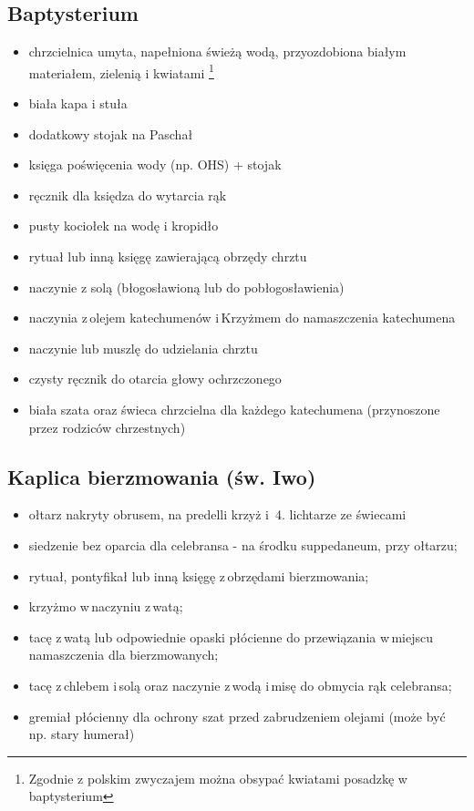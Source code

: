\subsection{Baptysterium}
\begin{itemize}
	\item chrzcielnica umyta, napełniona świeżą wodą, przyozdobiona
	      białym materiałem, zielenią i kwiatami \footnote{Zgodnie z polskim
			  zwyczajem można obsypać kwiatami posadzkę w baptysterium}
	\item \textcolor{black!50}{biała kapa i stuła}
	\item dodatkowy stojak na Paschał
	\item księga poświęcenia wody (np. OHS) + stojak
	\item ręcznik dla księdza do wytarcia rąk
	\item pusty kociołek na wodę i kropidło
	\item rytuał lub inną księgę zawierającą obrzędy chrztu
	\item naczynie z solą (błogosławioną lub do pobłogosławienia)
	\item naczynia z olejem katechumenów i Krzyżmem do namaszczenia katechumena
	\item naczynie lub muszlę do udzielania chrztu
	\item czysty ręcznik do otarcia głowy ochrzczonego
	\item biała szata oraz świeca chrzcielna dla każdego katechumena
	      (przynoszone przez rodziców chrzestnych)
\end{itemize}

\subsection{Kaplica bierzmowania (św. Iwo)}
\begin{itemize}
	\item ołtarz nakryty obrusem, na predelli krzyż i  4. lichtarze ze świecami
	\item siedzenie bez oparcia dla celebransa - na środku suppedaneum, przy
	      ołtarzu;
	\item rytuał, pontyfikał lub inną księgę z obrzędami bierzmowania;
	\item krzyżmo w naczyniu z watą;
	\item tacę z watą lub odpowiednie opaski płócienne do przewiązania w miejscu
	      namaszczenia dla bierzmowanych;
	\item tacę z chlebem i solą oraz naczynie z wodą i misę do obmycia rąk
	      celebransa;
	\item gremiał płócienny dla ochrony szat przed zabrudzeniem olejami (może
	      być np. stary humerał)
\end{itemize}

